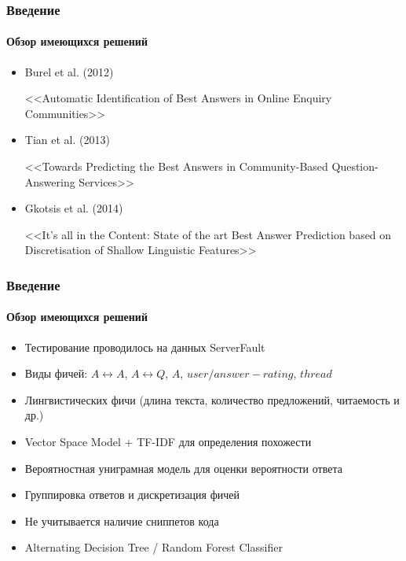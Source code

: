 \documentclass[10pt]{beamer}
\begin{document}
\begin{frame}
\frametitle{Введение}
\framesubtitle{Обзор имеющихся решений}

\begin{itemize}
	\setlength{\itemsep}{1em}

	\item Burel et al. (2012)
	
	<<Automatic Identification of Best Answers in Online Enquiry Communities>> 

	\item Tian et al. (2013) 
	
	<<Towards Predicting the Best Answers in Community-Based Question-Answering Services>> 

	\item Gkotsis et al. (2014)
	
	<<It’s all in the Content: State of the art Best Answer Prediction based on Discretisation of Shallow Linguistic Features>>

\end{itemize}

\end{frame}


\begin{frame}
\frametitle{Введение}
\framesubtitle{Обзор имеющихся решений}

\begin{itemize}
	\item Тестирование проводилось на данных ServerFault
	\item Виды фичей: $A \leftrightarrow A$, $A \leftrightarrow Q$, $A$, $user/answer-rating$, $thread$ 
	\item Лингвистических фичи (длина текста, количество предложений, читаемость и др.)
	\item Vector Space Model + TF-IDF для определения похожести
	\item Вероятностная униграмная модель для оценки вероятности ответа
	\item Группировка ответов и дискретизация фичей
	\item Не учитывается наличие сниппетов кода
	\item Alternating Decision Tree / Random Forest Classifier
\end{itemize}

\end{frame}

\end{document}
